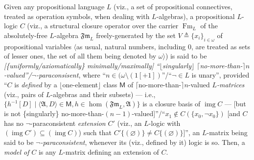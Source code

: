 \documentclass[bsl,meeting]{asl}
\newcommand{\NP}{}
\newcommand{\mf}[1]{\mathfrak{#1}}
\newcommand{\msf}[1]{\mathsf{#1}}
\newcommand{\couple}[2]{\langle{#1},{#2}\rangle}
\newcommand{\FA}{\mf{Fm}}
\newcommand{\inverse}[1]{{#1}^{-1}}
\DeclareMathOperator{\Fm}{Fm}
\DeclareMathOperator{\img}{img}
\begin{document}
\thispagestyle{empty}


\NP
{}



Given any propositional language $L$
(viz., a set of propositional connectives,
treated as operation symbols, when dealing
with $L$-algebras),
a propositional $L$-logic $C$ %
(viz., a structural %
closure operator over the carrier $\Fm_L$
of the absolutely-free $L$-algebra $\FA_L$
freely-generated by the set $V\triangleq\{x_i\}_{i\in\omega}$
of propositional variables
$\langle$as usual, natural numbers, including $0$,
are treated as sets of lesser ones,
the set of all them being denoted by $\omega\rangle$)
is said to be {\em [\/\{uniformly/axiomatically\/\} minimally/maximally]\/
``\/$\lfloor$singularly\/$\rfloor$
$\lceil$no-more-than-$\rceil n$-valued''/$\neg$-paraconsisent},
whe\-re ``$n\in(\omega\setminus(1[+1])$''/``$\neg\in L$ is unary'',
provided ``$C$ is {\em defined\/} by a
$\lfloor$one-element$\rfloor$ class $\msf{M}$ of $\lceil$no-more-than-$\rceil n$-valued
{\em $L$-matrices\/}
(viz., pairs of %
$L$-algebras and their
subsets)
--- i.e., $\{\inverse{h}[D]\mid\couple{\mf{A}}{D}\in\msf{M},
h\in\hom(\FA_L,\mf{A})\}$
is a closure basis of $\img C$ ---
[but is not \{singularly\} no-more-than-$(n-1)$-valued]''/``$x_1\not\in
C(\{x_0,\neg x_0\})$ [and $C$ has no $\neg$-paraconsistent
{\em extension\/} $C'$ (viz., an $L$-logic with $(\img C')\subseteq(\img C)$)
such that $C'\{(\varnothing)\}\neq C\{(\varnothing)\}$]'',
an $L$-matrix being said to be {\em $\neg$-paraconsistent},
whenever its (viz., defined by it) logic
is so.
Then, a {\em model of\/} $C$ is any $L$-matrix defining an
extension of $C$.
\end{document}
